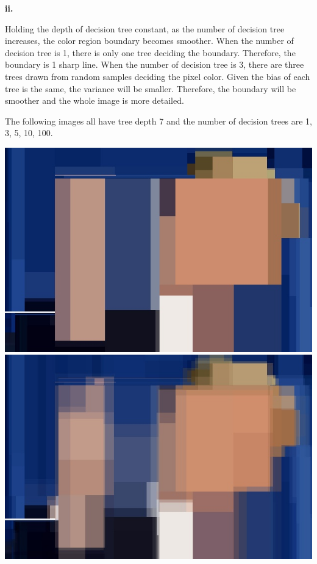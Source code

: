 \documentclass[12pt]{article}
\begin{document}
{\medskip
\textbf{ii.}

Holding the depth of decision tree constant, as the number of decision tree increases, the color region boundary becomes smoother. When the number of decision tree is 1, there is only one tree deciding the boundary. Therefore, the boundary is 1 sharp line. When the number of decision tree is 3, there are three trees drawn from random samples deciding the pixel color. Given the bias of each tree is the same, the variance will be smaller. Therefore, the boundary will be smoother and the whole image is more detailed.

\medskip
The following images all have tree depth 7 and the number of decision trees are 1, 3, 5, 10, 100.

\includegraphics[scale=0.15]{P1/RF_Trump_depth7trees1.jpg}
\includegraphics[scale=0.15]{P1/RF_Trump_depth7trees3.jpg}
}
\end{document}

